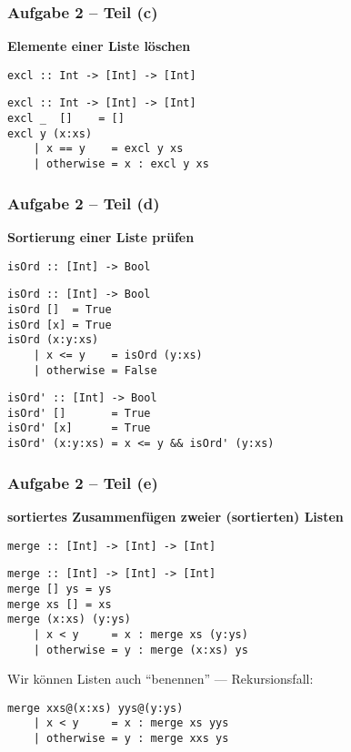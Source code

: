 \documentclass{beamer}
\begin{document}
\begin{frame}[t, fragile] \frametitle{Aufgabe 2 -- Teil (c)}
	\textbf{Elemente einer Liste löschen}
	
	\texttt{excl :: Int -> [Int] -> [Int]}
	
	\pause \bigskip
	
	\begin{lstlisting}[style=bg]
excl :: Int -> [Int] -> [Int]
excl _  []    = []
excl y (x:xs)
	| x == y    = excl y xs
	| otherwise = x : excl y xs
	\end{lstlisting}
\end{frame}

\begin{frame}[t, fragile] \frametitle{Aufgabe 2 -- Teil (d)}
	\small 
	\textbf{Sortierung einer Liste prüfen}
	
	\texttt{isOrd :: [Int] -> Bool}
	
	\pause \bigskip
	\begin{lstlisting}[style=bg]
isOrd :: [Int] -> Bool
isOrd []  = True
isOrd [x] = True
isOrd (x:y:xs)
	| x <= y    = isOrd (y:xs)
	| otherwise = False
	\end{lstlisting}
	\pause
	\begin{lstlisting}[style=bg]
isOrd' :: [Int] -> Bool
isOrd' []       = True
isOrd' [x]      = True
isOrd' (x:y:xs) = x <= y && isOrd' (y:xs)
	\end{lstlisting}
\end{frame}

\begin{frame}[t, fragile] \frametitle{Aufgabe 2 -- Teil (e)}
	\small
	\textbf{sortiertes Zusammenfügen zweier (sortierten) Listen}
	
	\texttt{merge :: [Int] -> [Int] -> [Int]}
	
	\pause \bigskip
	\begin{lstlisting}[style=bg]
merge :: [Int] -> [Int] -> [Int]
merge [] ys = ys
merge xs [] = xs
merge (x:xs) (y:ys)
	| x < y     = x : merge xs (y:ys)
	| otherwise = y : merge (x:xs) ys
	\end{lstlisting}
	\pause
	Wir können Listen auch ``benennen'' --- Rekursionsfall:
	\begin{lstlisting}[style=bg]
merge xxs@(x:xs) yys@(y:ys)
	| x < y     = x : merge xs yys
	| otherwise = y : merge xxs ys
	\end{lstlisting}
\end{frame}
\end{document}
